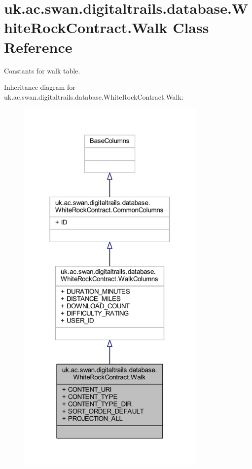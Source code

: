 \hypertarget{classuk_1_1ac_1_1swan_1_1digitaltrails_1_1database_1_1_white_rock_contract_1_1_walk}{\section{uk.\+ac.\+swan.\+digitaltrails.\+database.\+White\+Rock\+Contract.\+Walk Class Reference}
\label{classuk_1_1ac_1_1swan_1_1digitaltrails_1_1database_1_1_white_rock_contract_1_1_walk}
}


Constants for walk table.  




Inheritance diagram for uk.\+ac.\+swan.\+digitaltrails.\+database.\+White\+Rock\+Contract.\+Walk\+:
\nopagebreak
\begin{figure}[H]
\begin{center}
\leavevmode
\includegraphics[width=262pt]{classuk_1_1ac_1_1swan_1_1digitaltrails_1_1database_1_1_white_rock_contract_1_1_walk__inherit__graph}
\end{center}
\end{figure}


